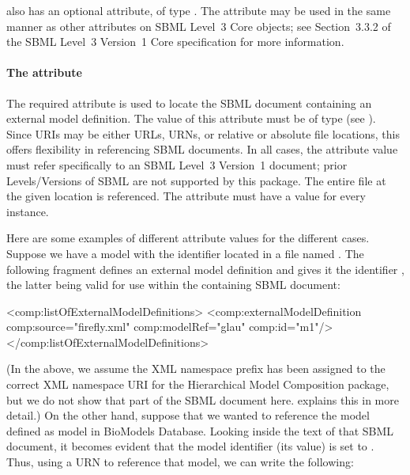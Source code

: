 \ExternalModelDefinition also has an optional  attribute, of
type .  The  attribute may be used
in the same manner as other  attributes on SBML Level~3 Core
objects; see Section~3.3.2 of the SBML Level~3 Version~1 Core
specification for more information.


\paragraph{The \fixttspace{} attribute}

The required attribute  is used to locate the SBML
document containing an external model definition.  The value of this
attribute must be of type  (see ).
Since URIs may be either URLs, URNs, or relative or absolute file
locations, this offers flexibility in referencing SBML documents.  In
all cases, the  attribute value must refer specifically to
an SBML Level~3 Version~1 document; prior Levels/Versions of SBML are
not supported by this package.  The entire file at the given location is
referenced.  The  attribute must have a value for every
\ExternalModelDefinition instance.

Here are some examples of different  attribute values for
the different cases.  Suppose we have a model with the identifier
 located in a file named .  The following
fragment defines an external model definition and gives it the
identifier , the latter being valid for use within the
containing SBML document:

\begin{example}
<comp:listOfExternalModelDefinitions>
    <comp:externalModelDefinition comp:source="firefly.xml" comp:modelRef="glau" comp:id="m1"/>
</comp:listOfExternalModelDefinitions>
\end{example}

(In the above, we assume the XML namespace prefix  has been
assigned to the correct XML namespace URI for the Hierarchical Model
Composition package, but we do not show that part of the SBML document
here.   explains this in more detail.)  On the other
hand, suppose that we wanted to reference the model defined as model
 in BioModels Database.  Looking inside the text of
that SBML document, it becomes evident that the model identifier (its
 value) is set to .  Thus, using a URN to reference
that model, we can write the following:

